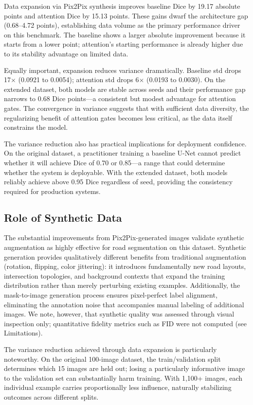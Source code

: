 \documentclass[conference]{IEEEtran}
\begin{document}
Data expansion via Pix2Pix synthesis improves baseline Dice by 19.17 absolute points and attention Dice by 15.13 points. These gains dwarf the architecture gap (0.68--4.72 points), establishing data volume as the primary performance driver on this benchmark. The baseline shows a larger absolute improvement because it starts from a lower point; attention's starting performance is already higher due to its stability advantage on limited data.

Equally important, expansion reduces variance dramatically. Baseline std drops 17$\times$ (0.0921 to 0.0054); attention std drops 6$\times$ (0.0193 to 0.0030). On the extended dataset, both models are stable across seeds and their performance gap narrows to 0.68 Dice points---a consistent but modest advantage for attention gates. The convergence in variance suggests that with sufficient data diversity, the regularizing benefit of attention gates becomes less critical, as the data itself constrains the model.

The variance reduction also has practical implications for deployment confidence. On the original dataset, a practitioner training a baseline U-Net cannot predict whether it will achieve Dice of 0.70 or 0.85---a range that could determine whether the system is deployable. With the extended dataset, both models reliably achieve above 0.95 Dice regardless of seed, providing the consistency required for production systems.

\subsection{Role of Synthetic Data}

The substantial improvements from Pix2Pix-generated images validate synthetic augmentation as highly effective for road segmentation on this dataset. Synthetic generation provides qualitatively different benefits from traditional augmentation (rotation, flipping, color jittering): it introduces fundamentally new road layouts, intersection topologies, and background contexts that expand the training distribution rather than merely perturbing existing examples. Additionally, the mask-to-image generation process ensures pixel-perfect label alignment, eliminating the annotation noise that accompanies manual labeling of additional images. We note, however, that synthetic quality was assessed through visual inspection only; quantitative fidelity metrics such as FID were not computed (see Limitations).

The variance reduction achieved through data expansion is particularly noteworthy. On the original 100-image dataset, the train/validation split determines which 15 images are held out; losing a particularly informative image to the validation set can substantially harm training. With 1,100+ images, each individual example carries proportionally less influence, naturally stabilizing outcomes across different splits.
\end{document}
